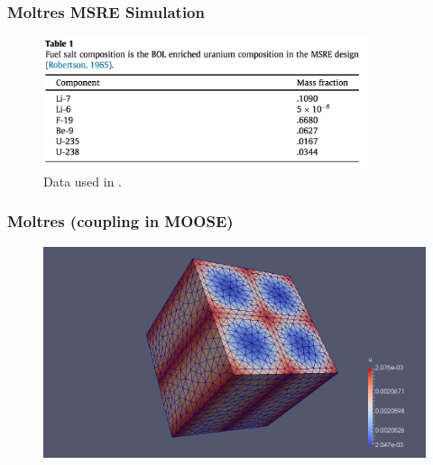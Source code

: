\begin{frame}
        \frametitle{Moltres MSRE Simulation}
  \begin{figure}
   \vspace{-0.05in}
   \includegraphics[width=0.85\textwidth]{./images/moltres-composition.png}
          \caption{Data used in \cite{lindsay_introduction_2018}.}
    \end{figure}
\end{frame}


\begin{frame}
        \frametitle{Moltres (coupling in MOOSE)}
  \begin{figure}
   \vspace{-0.05in}
   \includegraphics[height=0.85\textheight]{./images/lindsay_msre_moose.png}
    \end{figure}
\end{frame}



